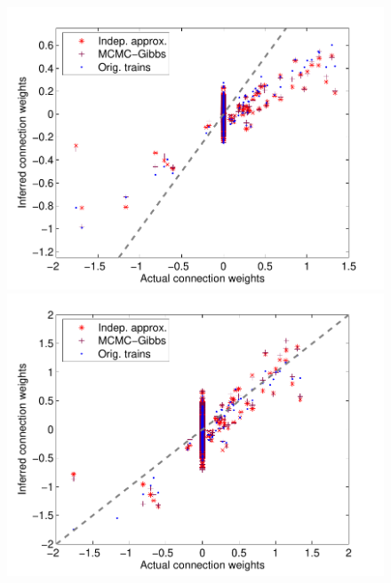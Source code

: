 \begin{figure}[h]
\centering
\begin{minipage}[c]{0.45\hsize}
\includegraphics[width=\hsize]{../figs/FigureA3_scatter_three}
\end{minipage}
\begin{minipage}[c]{0.45\hsize}
\includegraphics[width=\hsize]{../figs/FigureA3_scatter_three_corrected}
\end{minipage}

\end{figure}
